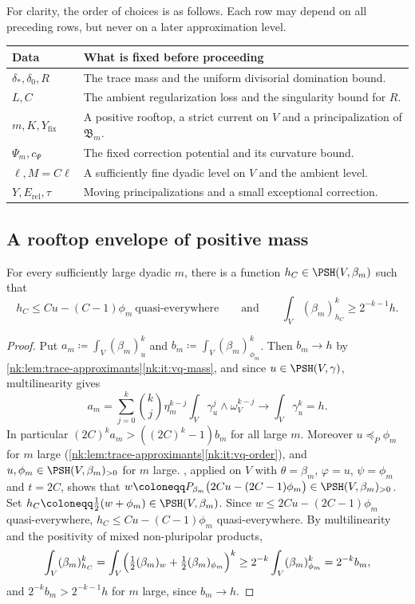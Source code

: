 For clarity, the order of choices is as follows. Each row may depend on
all preceding rows, but never on a later approximation level.
\begin{center}
\small
\begin{tabular}{p{}p{}}
\toprule
Data & What is fixed before proceeding \\
\midrule
$\delta_*,\delta_0,R$ & The trace mass and the uniform divisorial domination bound. \\
$L,C$ & The ambient regularization loss and the singularity bound for $R$. \\
$m,K,Y_{\mathrm{fix}}$ & A positive rooftop, a strict current on $V$ and a principalization of $\mathfrak B_m$. \\
$\Psi_m,c_\Psi$ & The fixed correction potential and its curvature bound. \\
$\ell,M=C\ell$ & A sufficiently fine dyadic level on $V$ and the ambient level. \\
$Y,E_{\mathrm{rel}},\tau$ & Moving principalizations and a small exceptional correction. \\
\bottomrule
\end{tabular}
\end{center}

\subsection{A rooftop envelope of positive mass}

\begin{lemma}\label{nk:lem:positive-rooftop}
For every sufficiently large dyadic $m$, there is a function
$h_C\in\PSH(V,\beta_m)$ such that
\[
  h_C\le Cu-(C-1)\phi_m\ \text{quasi-everywhere}
  \qquad\text{and}\qquad
  \int_V(\beta_m)_{h_C}^k\ge2^{-k-1}h .
\]
\end{lemma}

\begin{proof}
Put $a_m\coloneqq \int_V(\beta_m)_u^k$ and $b_m\coloneqq \int_V(\beta_m)_{\phi_m}^k$.
Then $b_m\to h$ by
\cref{nk:lem:trace-approximants}\ref{nk:it:vq-mass}, and since
$u\in\PSH(V,\gamma)$, multilinearity gives
\[
  a_m=\sum_{j=0}^k\binom kj\eta_m^{k-j}\int_V\gamma_u^j\wedge\omega_V^{k-j}
  \longrightarrow\int_V\gamma_u^k=h.
\]
In particular $(2C)^ka_m>((2C)^k-1)b_m$ for all large $m$. Moreover
$u\preceq_P\phi_m$ for $m$ large
(\cref{nk:lem:trace-approximants}\ref{nk:it:vq-order}), and
$u,\phi_m\in\PSH(V,\beta_m)_{>0}$ for $m$ large.
, applied on $V$ with $\theta=\beta_m$,
$\varphi=u$, $\psi=\phi_m$ and $t=2C$, shows that
$w\coloneqq P_{\beta_m}\bigl(2Cu-(2C-1)\phi_m\bigr)\in\PSH(V,\beta_m)_{>0}$. Set
$h_C\coloneqq \tfrac12(w+\phi_m)\in\PSH(V,\beta_m)$. Since
$w\le 2Cu-(2C-1)\phi_m$ quasi-everywhere,
$h_C\le Cu-(C-1)\phi_m$ quasi-everywhere. By multilinearity and the
positivity of mixed non-pluripolar products,
\[
  \int_V(\beta_m)_{h_C}^k
  =\int_V\Bigl(\tfrac12(\beta_m)_{w}+\tfrac12(\beta_m)_{\phi_m}\Bigr)^k
  \ge2^{-k}\int_V(\beta_m)_{\phi_m}^k=2^{-k}b_m,
\]
and $2^{-k}b_m>2^{-k-1}h$ for $m$ large, since $b_m\to h$.
\end{proof}

